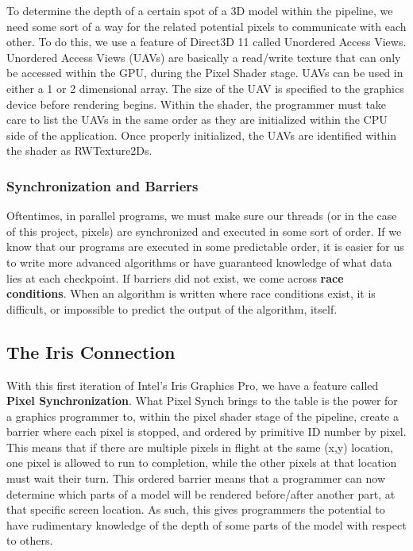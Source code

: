 \documentclass[a4paper, 12pt]{article}
\begin{document}
To determine the depth of a certain spot of a 3D model within the pipeline, we
need some sort of a way for the related potential pixels to communicate with
each other. To do this, we use a feature of Direct3D 11 called Unordered
Access Views. Unordered Access Views (UAVs) are basically a read/write texture
that can only be accessed within the GPU, during the Pixel Shader stage. UAVs
can be used in either a 1 or 2 dimensional array. The size of the UAV is
specified to the graphics device before rendering begins. Within the shader,
the programmer must take care to list the UAVs in the same order as they are
initialized within the CPU side of the application. Once properly initialized,
the UAVs are identified within the shader as RWTexture2Ds.

\subsubsection{Synchronization and Barriers}

Oftentimes, in parallel programs, we must make sure our threads (or in the
case of this project, pixels) are synchronized and executed in some sort of
order. If we know that our programs are executed in some predictable order, it
is easier for us to write more advanced algorithms or have guaranteed
knowledge of what data lies at each checkpoint. If barriers did not exist, we
come across \textbf{race conditions}. When an algorithm is written where race
conditions exist, it is difficult, or impossible to predict the output of the
algorithm, itself.

\subsection{The Iris Connection}

With this first iteration of Intel's Iris Graphics Pro, we have a feature
called \textbf{Pixel Synchronization}. What Pixel Synch brings to the table is
the power for a graphics programmer to, within the pixel shader stage of the
pipeline, create a barrier where each pixel is stopped, and ordered by
primitive ID number by pixel. This means that if there are multiple pixels in
flight at the same (x,y) location, one pixel is allowed to run to completion,
while the other pixels at that location must wait their turn. This ordered
barrier means that a programmer can now determine which parts of a model will
be rendered before/after another part, at that specific screen location. As
such, this gives programmers the potential to have rudimentary knowledge of
the depth of some parts of the model with respect to others.
\end{document}
